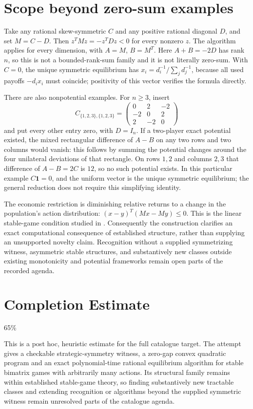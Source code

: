 \documentclass[11pt]{article}
\theoremstyle{remark}\newtheorem{remark}[theorem]{Remark}
\begin{document}
\section*{Scope beyond zero-sum examples}
Take any rational skew-symmetric $C$ and any positive rational diagonal $D$, and set $M=C-D$. Then $z^TMz=-z^TDz<0$ for every nonzero $z$. The algorithm applies for every dimension, with $A=M$, $B=M^T$. Here $A+B=-2D$ has rank $n$, so this is not a bounded-rank-sum family and it is not literally zero-sum. With $C=0$, the unique symmetric equilibrium has $x_i=d_i^{-1}/\sum_jd_j^{-1}$, because all used payoffs $-d_ix_i$ must coincide; positivity of this vector verifies the formula directly.

There are also nonpotential examples. For $n\ge3$, insert
\[
 C_{\{1,2,3\},\{1,2,3\}}=
 \begin{pmatrix}0&2&-2\\-2&0&2\\2&-2&0\end{pmatrix}
\]
and put every other entry zero, with $D=I_n$. If a two-player exact potential existed, the mixed rectangular difference of $A-B$ on any two rows and two columns would vanish: this follows by summing the potential changes around the four unilateral deviations of that rectangle. On rows $1,2$ and columns $2,3$ that difference of $A-B=2C$ is $12$, so no such potential exists. In this particular example $C\mathbf1=0$, and the uniform vector is the unique symmetric equilibrium; the general reduction does not require this simplifying identity.

The economic restriction is diminishing relative returns to a change in the population's action distribution: $(x-y)^T(Mx-My)\le0$. This is the linear stable-game condition studied in \cite{stable}. Consequently the construction clarifies an exact computational consequence of established structure, rather than supplying an unsupported novelty claim. Recognition without a supplied symmetrizing witness, asymmetric stable structures, and substantively new classes outside existing monotonicity and potential frameworks remain open parts of the recorded agenda.

\section{Completion Estimate}
65\%

This is a post hoc, heuristic estimate for the full catalogue target.
The attempt gives a checkable strategic-symmetry witness, a zero-gap convex quadratic program and an exact polynomial-time rational equilibrium algorithm for stable bimatrix games with arbitrarily many actions. Its structural family remains within established stable-game theory, so finding substantively new tractable classes and extending recognition or algorithms beyond the supplied symmetric witness remain unresolved parts of the catalogue agenda.
\end{document}
